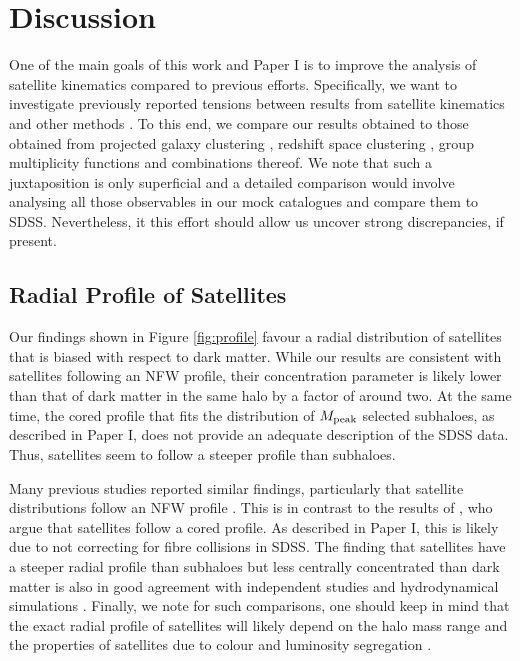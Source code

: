 \documentclass[fleqn,usenatbib,useAMS]{mnras}
\begin{document}
\section{Discussion}

One of the main goals of this work and Paper I is to improve the analysis of satellite kinematics compared to previous efforts. Specifically, we want to investigate previously reported tensions between results from satellite kinematics and other methods \citep[see e.g.][]{Leauthaud+12, Mandelbaum+16}. To this end, we compare our results obtained to those obtained from projected galaxy clustering \citep{Zehavi+11, Vakili+16, Zentner+16}, redshift space clustering \citep{Guo+15b}, group multiplicity functions \citep{Sinha+17} and combinations thereof. We note that such a juxtaposition is only superficial and a detailed comparison would involve analysing all those observables in our mock catalogues and compare them to SDSS. Nevertheless, it this effort should allow us uncover strong discrepancies, if present.

\subsection{Radial Profile of Satellites}

Our findings shown in Figure \ref{fig:profile} favour a radial distribution of satellites that is biased with respect to dark matter. While our results are consistent with satellites following an NFW profile, their concentration parameter is likely lower than that of dark matter in the same halo by a factor of around two. At the same time, the cored profile that fits the distribution of $M_{\rm peak}$ selected subhaloes, as described in Paper I, does not provide an adequate description of the SDSS data. Thus, satellites seem to follow a steeper profile than subhaloes. 

Many previous studies reported similar findings, particularly that satellite distributions follow an NFW profile \citep[see e.g.][]{vdBosch+05c, Yang+05, Guo+12a}. This is in contrast to the results of \cite{More+09b}, who argue that satellites follow a cored profile. As described in Paper I, this is likely due to \cite{More+09b} not correcting for fibre collisions in SDSS. The finding that satellites have a steeper radial profile than subhaloes but less centrally concentrated than dark matter is also in good agreement with independent studies \citep{Yang+05, Chen08} and hydrodynamical simulations \citep{Nagai+05, Vogelsberger+14}. Finally, we note for such comparisons, one should keep in mind that the exact radial profile of satellites will likely depend on the halo mass range and the properties of satellites due to colour and luminosity segregation \citep{Chen08, Guo+13}.
\end{document}
